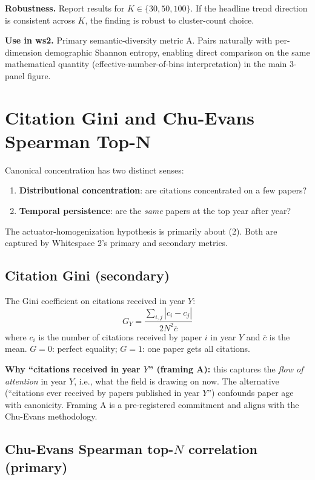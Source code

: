 \documentclass[11pt]{article}
\begin{document}
\textbf{Robustness.} Report results for $K \in \{30, 50, 100\}$. If
the headline trend direction is consistent across $K$, the finding is
robust to cluster-count choice.

\textbf{Use in ws2.} Primary semantic-diversity metric A. Pairs
naturally with per-dimension demographic Shannon entropy, enabling
direct comparison on the same mathematical quantity
(effective-number-of-bins interpretation) in the main 3-panel figure.

\section{Citation Gini and Chu-Evans Spearman Top-N}
\label{sec:canonical}

Canonical concentration has two distinct senses:
\begin{enumerate}[nosep,label=(\arabic*)]
  \item \textbf{Distributional concentration}: are citations concentrated
    on a few papers?
  \item \textbf{Temporal persistence}: are the \textit{same} papers at
    the top year after year?
\end{enumerate}
The actuator-homogenization hypothesis is primarily about (2). Both
are captured by Whitespace 2's primary and secondary metrics.

\subsection{Citation Gini (secondary)}

The Gini coefficient on citations received in year $Y$:
\[
  G_Y = \frac{\sum_{i,j} |c_i - c_j|}{2 N^2 \bar c}
\]
where $c_i$ is the number of citations received by paper $i$ in year $Y$
and $\bar c$ is the mean. $G = 0$: perfect equality; $G = 1$: one paper
gets all citations.

\textbf{Why ``citations received in year $Y$'' (framing A):} this
captures the \textit{flow of attention} in year $Y$, i.e., what the
field is drawing on now. The alternative (``citations ever received by
papers published in year $Y$'') confounds paper age with canonicity.
Framing A is a pre-registered commitment and aligns with the
Chu-Evans methodology.

\subsection{Chu-Evans Spearman top-$N$ correlation (primary)}
\end{document}
